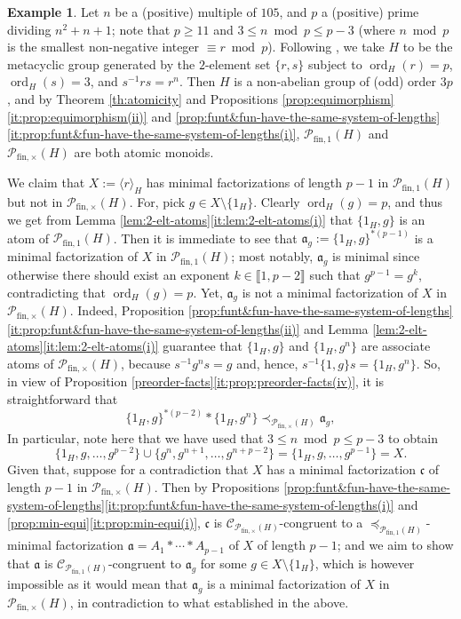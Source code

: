 \documentclass{report}
\newcommand{\llb}{\llbracket}
\newcommand{\rrb}{\rrbracket}
\newcommand{\fin}{\textrm{fin}}
\newcommand{\ord}{{\operatorname{ord}}}
\renewcommand{\:}{\text{:}}
\theoremstyle{definition}
\newtheorem{eg}[defn]{Example}
\begin{document}
\begin{eg}\label{exa:strict-inclusion}
	Let $n$ be a (positive) multiple of $105$, and $p$ a (positive) prime dividing $n^2 + n + 1$; note that $p \ge 11$ and $3 \le n \bmod p \le p-3$ (where $n \bmod p$ is the smallest non-negative integer $\equiv r \bmod p$). Following \cite[p. 27]{gorenstein80}, we take $H$ to be the metacyclic group generated by the $2$-element set $\{r, s\}$ subject to $\ord_H(r) = p$, $\ord_H(s) = 3$, and $s^{-1} r s = r^n$. 
	Then $H$ is a non-abelian group of (odd) order $3p$, and by Theorem \ref{th:atomicity} and Propositions \ref{prop:equimorphism}\ref{it:prop:equimorphism(ii)} and \ref{prop:funt&fun-have-the-same-system-of-lengths}\ref{it:prop:funt&fun-have-the-same-system-of-lengths(i)}, $\mathcal P_{\fin,1}(H)$ and $\mathcal P_{\fin,\times}(H)$ are both atomic monoids. 
	
	We claim that $X := \langle r \rangle_H$ has minimal factorizations of length $p-1$ in $\mathcal P_{\fin,1}(H)$ but not in $\mathcal P_{\fin,\times}(H)$.
	For, pick $g \in X \setminus \{1_H\}$. Clearly $\ord_H(g) = p$, and thus we get from Lemma \ref{lem:2-elt-atoms}\ref{it:lem:2-elt-atoms(i)} that $\{1_H, g\}$ is an atom of $\mathcal P_{\fin,1}(H)$. Then it is immediate to see that $\mathfrak a_g := \{1_H, g\}^{\ast (p-1)}$ is a minimal factorization of $X$ in $\mathcal P_{\fin,1}(H)$; most notably, $\mathfrak a_g$ is minimal since otherwise there should exist an exponent $k \in \llb 1, p-2 \rrb$ such that $g^{p-1} = g^k$, contradicting that $\ord_H(g) = p$. Yet, $\mathfrak a_g$ is not a minimal factorization of $X$ in $\mathcal P_{\fin,\times}(H)$.
	Indeed, Proposition \ref{prop:funt&fun-have-the-same-system-of-lengths}\ref{it:prop:funt&fun-have-the-same-system-of-lengths(ii)} and Lemma \ref{lem:2-elt-atoms}\ref{it:lem:2-elt-atoms(i)} guarantee that $\{1_H, g\}$ and $\{1_H, g^n\}$ are associate atoms of $\mathcal P_{\fin,\times}(H)$, because $s^{-1} g^n s = g$ and, hence, $s^{-1} \{1, g\} s = \{1_H, g^n\}$. So, in view of Proposition \ref{preorder-facts}\ref{it:prop:preorder-facts(iv)}, it is straightforward that 
	\[
	\{1_H, g\}^{\ast (p-2)} \ast \{1_H, g^n\} \prec_{\mathcal P_{\fin,\times}(H)} \mathfrak a_g,
	\]
	In particular, note here that we have used that $3 \le n \bmod p \le p-3$ to obtain
	\[
	\{1_H, g, \ldots, g^{p-2}\} \cup \{g^n, g^{n+1}, \ldots, g^{n+p-2}\} = \{1_H, g, \ldots, g^{p-1}\} = X.
	\]
	Given that, suppose for a contradiction that $X$ has a minimal factorization $\mathfrak c$ of length $p-1$ in $\mathcal P_{\fin,\times}(H)$. Then by Propositions \ref{prop:funt&fun-have-the-same-system-of-lengths}\ref{it:prop:funt&fun-have-the-same-system-of-lengths(i)} and \ref{prop:min-equi}\ref{it:prop:min-equi(i)}, $\mathfrak c$ is $\mathscr C_{\mathcal P_{\fin,\times}(H)}$-congruent to a $\preceq_{\mathcal P_{\fin,1}(H)}$-minimal fac\-tor\-ization $\mathfrak a = A_1 \ast \cdots \ast A_{p-1}$ of $X$ of length $p-1$; and we aim to show that $\mathfrak a$ is $\mathscr C_{\mathcal P_{\fin,1}(H)}$-congruent to $\mathfrak a_g$ for some $g \in X \setminus \{1_H\}$, which is however impossible as it would mean that $\mathfrak a_g$ is a minimal factorization of $X$ in $\mathcal P_{\fin,\times}(H)$, in contradiction to what established in the above.
	

\end{eg}
\end{document}
